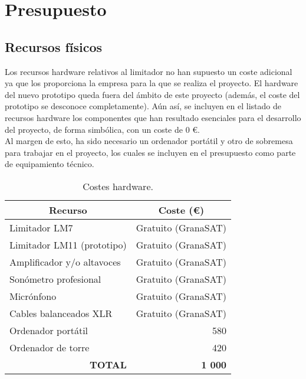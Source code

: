 \chapter{Presupuesto} \label{cap:presupuesto}

\section{Recursos físicos}

Los recursos hardware relativos al limitador no han supuesto un coste adicional ya que los proporciona la empresa para la que se realiza el proyecto. El hardware del nuevo prototipo queda fuera del ámbito de este proyecto (además, el coste del prototipo se desconoce completamente). Aún así, se incluyen en el listado de recursos hardware los componentes que han resultado esenciales para el desarrollo del proyecto, de forma simbólica, con un coste de 0 €. \\
Al margen de esto, ha sido necesario un ordenador portátil y otro de sobremesa para trabajar en el proyecto, los cuales se incluyen en el presupuesto como parte de equipamiento técnico.

\begin{table}[h]
\centering
\begin{tabular}{lr}
\hline
\multicolumn{1}{c}{\textbf{Recurso}} & \multicolumn{1}{c}{\textbf{Coste (€)}} \\ \hline
Limitador LM7                        & Gratuito (GranaSAT)                    \\
Limitador LM11 (prototipo)           & Gratuito (GranaSAT)                    \\
Amplificador y/o altavoces           & Gratuito (GranaSAT)                    \\
Sonómetro profesional                & Gratuito (GranaSAT)                    \\
Micrónfono                           & Gratuito (GranaSAT)                    \\
Cables balanceados XLR               & Gratuito (GranaSAT)                    \\
Ordenador portátil                   & 580                                    \\
Ordenador de torre                   & 420                                    \\ \hline
\multicolumn{1}{r}{\textbf{TOTAL}}   & \textbf{1 000}
\end{tabular}%
\caption{Costes hardware.}
\label{tab:presupuesto-hardware}
\end{table}

